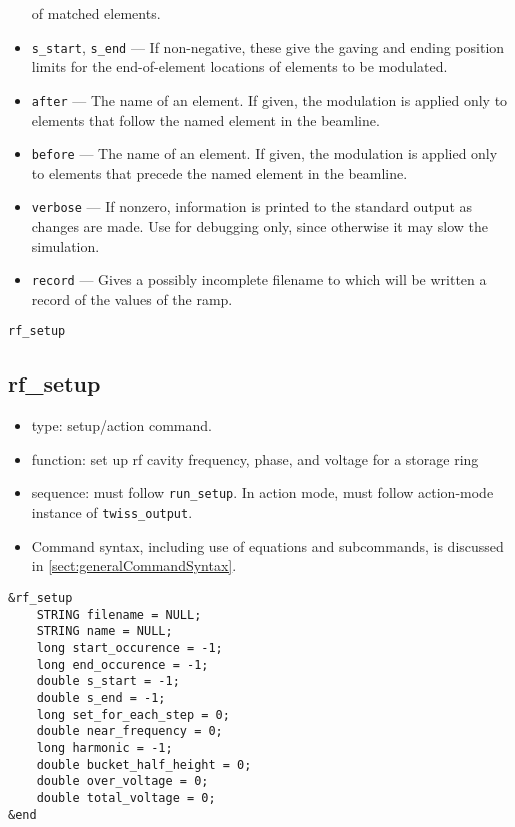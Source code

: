 \documentclass[11pt]{article}
\begin{document}
\begin{itemize}
 of matched elements.
\item \verb|s_start|, \verb|s_end| --- If non-negative, these give the gaving and ending position
 limits for the end-of-element locations of elements to be modulated.
\item \verb|after| --- The name of an element.  If given, the modulation is applied only to elements
 that follow the named element in the beamline.  
\item \verb|before| --- The name of an element.  If given, the modulation is applied only to elements
 that precede the named element in the beamline. 
\item \verb|verbose| --- If nonzero, information is printed to the standard output as changes are
        made.  Use for debugging only, since otherwise it may slow the simulation.
\item \verb|record| --- Gives a possibly incomplete filename to which will be written a record of the values of
  the ramp.
\end{itemize}

\newpage
\begin{center}{\Large\verb|rf_setup|}\end{center}
\subsection{rf\_setup\label{subsec:rfsetup}}

\begin{itemize}
\item type: setup/action command.
\item function: set up rf cavity frequency, phase, and voltage for a storage ring
\item sequence: must follow \verb|run_setup|. In action mode, must follow action-mode instance of \verb|twiss_output|.
\item Command syntax, including use of equations and subcommands, is discussed in \ref{sect:generalCommandSyntax}.
\end{itemize}

\begin{verbatim}
&rf_setup
    STRING filename = NULL;
    STRING name = NULL;
    long start_occurence = -1;
    long end_occurence = -1;
    double s_start = -1;
    double s_end = -1;
    long set_for_each_step = 0;
    double near_frequency = 0; 
    long harmonic = -1;
    double bucket_half_height = 0;
    double over_voltage = 0;
    double total_voltage = 0;
&end
\end{verbatim}
\end{document}
